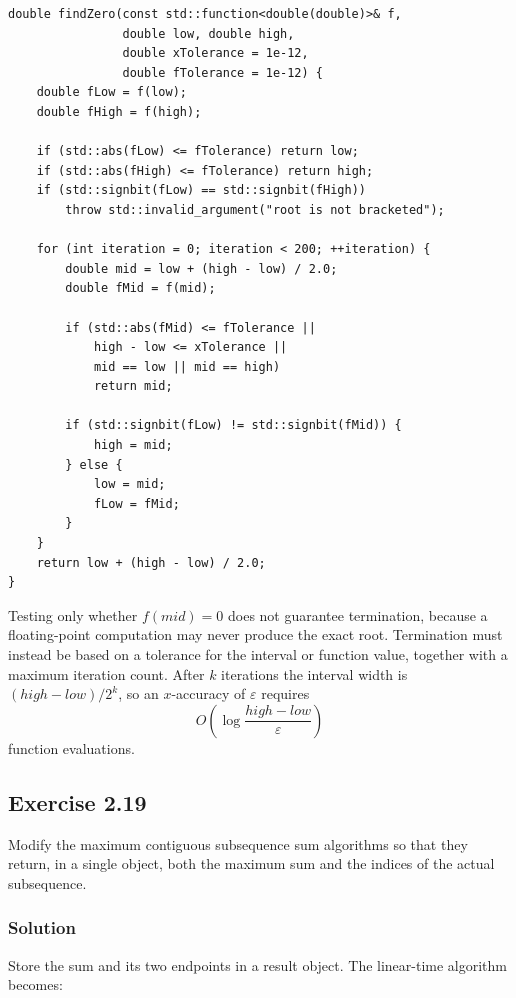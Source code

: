 \documentclass[12pt,a4paper]{article}
\begin{document}
\begin{lstlisting}
double findZero(const std::function<double(double)>& f,
                double low, double high,
                double xTolerance = 1e-12,
                double fTolerance = 1e-12) {
    double fLow = f(low);
    double fHigh = f(high);

    if (std::abs(fLow) <= fTolerance) return low;
    if (std::abs(fHigh) <= fTolerance) return high;
    if (std::signbit(fLow) == std::signbit(fHigh))
        throw std::invalid_argument("root is not bracketed");

    for (int iteration = 0; iteration < 200; ++iteration) {
        double mid = low + (high - low) / 2.0;
        double fMid = f(mid);

        if (std::abs(fMid) <= fTolerance ||
            high - low <= xTolerance ||
            mid == low || mid == high)
            return mid;

        if (std::signbit(fLow) != std::signbit(fMid)) {
            high = mid;
        } else {
            low = mid;
            fLow = fMid;
        }
    }
    return low + (high - low) / 2.0;
}
\end{lstlisting}

Testing only whether $f(\mathit{mid})=0$ does not guarantee termination,
because a floating-point computation may never produce the exact root.
Termination must instead be based on a tolerance for the interval or
function value, together with a maximum iteration count. After $k$
iterations the interval width is $(\mathit{high}-\mathit{low})/2^k$, so
an $x$-accuracy of $\varepsilon$ requires
\[
\boxed{O\!\left(\log\frac{\mathit{high}-\mathit{low}}{\varepsilon}
       \right)}
\]
function evaluations.

\subsection*{\color{sectionnavy}Exercise 2.19}

\noindent
Modify the maximum contiguous subsequence sum algorithms so that they
return, in a single object, both the maximum sum and the indices of the
actual subsequence.

\subsubsection*{\color{sectionnavy}Solution}

Store the sum and its two endpoints in a result object. The linear-time
algorithm becomes:
\end{document}
